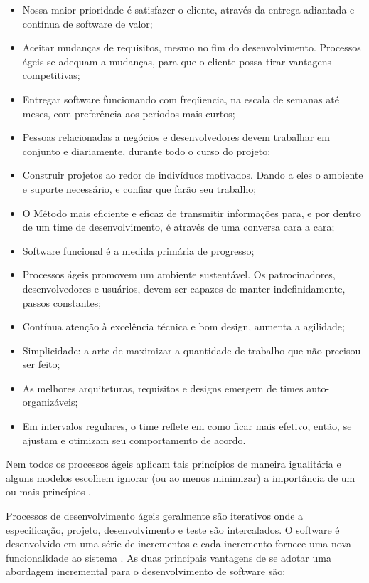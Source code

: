 \begin{itemize}
    \item Nossa maior prioridade é satisfazer o cliente, através da entrega adiantada e contínua de software de valor;
    \item Aceitar mudanças de requisitos, mesmo no fim do desenvolvimento. Processos ágeis se adequam a mudanças, para que o cliente possa tirar vantagens competitivas;
    \item Entregar software funcionando com freqüencia, na escala de semanas até meses, com preferência aos períodos mais curtos;
    \item Pessoas relacionadas a negócios e desenvolvedores devem trabalhar em conjunto e diariamente, durante todo o curso do projeto;
    \item Construir projetos ao redor de indivíduos motivados. Dando a eles o ambiente e suporte necessário, e confiar que farão seu trabalho;
    \item O Método mais eficiente e eficaz de transmitir informações para, e por dentro de um time de desenvolvimento, é através de uma conversa cara a cara;
    \item Software funcional é a medida primária de progresso;
    \item Processos ágeis promovem um ambiente sustentável. Os patrocinadores, desenvolvedores e usuários, devem ser capazes de manter indefinidamente, passos constantes;
    \item Contínua atenção à excelência técnica e bom design, aumenta a agilidade;
    \item Simplicidade: a arte de maximizar a quantidade de trabalho que não precisou ser feito;
    \item As melhores arquiteturas, requisitos e designs emergem de times auto-organizáveis;
    \item Em intervalos regulares, o time reflete em como ficar mais efetivo, então, se ajustam e otimizam seu comportamento de acordo.
\end{itemize}

Nem todos os processos ágeis aplicam tais princípios de maneira igualitária e alguns modelos escolhem ignorar (ou ao menos minimizar) a importância de um ou mais princípios \cite{pressman_2009}.

Processos de desenvolvimento ágeis geralmente são iterativos onde a
especificação, projeto, desenvolvimento e teste são intercalados. O software é desenvolvido
em uma série de incrementos e cada incremento fornece uma nova funcionalidade ao sistema \cite{sommerville_2006}. As duas principais
vantagens de se adotar uma abordagem incremental para o desenvolvimento de software são:

